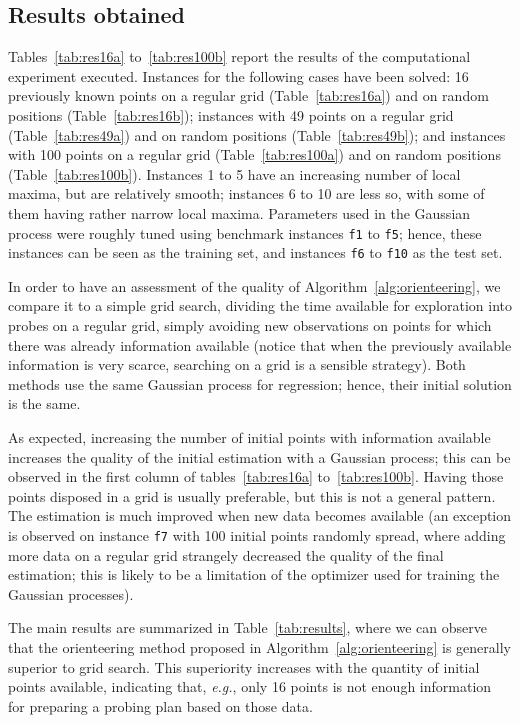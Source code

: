 \documentclass[smallextended]{svjour3}
\newcommand{\eg}{\emph{e.g.}}
\begin{document}
\subsection{Results obtained}

Tables~\ref{tab:res16a} to~\ref{tab:res100b} report the results of the computational experiment executed.
Instances for the following cases have been solved: 16 previously known points on a regular grid (Table~\ref{tab:res16a}) and on random positions (Table~\ref{tab:res16b}); 
instances with 49 points on a regular grid (Table~\ref{tab:res49a}) and on random positions (Table~\ref{tab:res49b}); and 
instances with 100 points on a regular grid (Table~\ref{tab:res100a}) and on random positions (Table~\ref{tab:res100b}).
Instances 1 to 5 have an increasing number of local maxima, but are relatively smooth; instances 6 to 10 are less so, with some of them having rather narrow local maxima.
Parameters used in the Gaussian process were roughly tuned using benchmark instances \texttt{f1} to \texttt{f5}; hence, these instances can be seen as the training set, and instances \texttt{f6} to \texttt{f10} as the test set.

In order to have an assessment of the quality of Algorithm~\ref{alg:orienteering}, we compare it to a simple grid search, dividing the time available for exploration into probes on a regular grid, simply avoiding new observations on points for which there was already information available (notice that when the previously available information is very scarce, searching on a grid is a sensible strategy).  Both methods use the same Gaussian process for regression; hence, their initial solution is the same.

As expected, increasing the number of initial points with information available increases the quality of the initial estimation with a Gaussian process; this can be observed in the first column of tables~\ref{tab:res16a} to~\ref{tab:res100b}.  Having those points disposed in a grid is usually preferable, but this is not a general pattern.  The estimation is much improved when new data becomes available (an exception is observed on instance \texttt{f7} with 100 initial points randomly spread, where adding more data on a regular grid strangely decreased the quality of the final estimation; this is likely to be a limitation of the optimizer used for training the Gaussian processes).

The main results are summarized in Table~\ref{tab:results}, where we can observe that the orienteering method proposed in Algorithm~\ref{alg:orienteering} is generally superior to grid search.  This superiority increases with the quantity of initial points available, indicating that, \eg, only 16 points is not enough information for preparing a probing plan based on those data.
\end{document}
